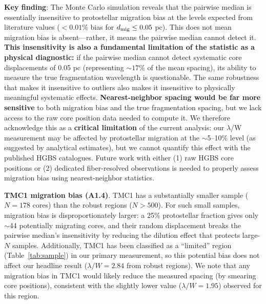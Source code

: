 \documentclass[twoside,twocolumn]{mnras}
\begin{document}
\textbf{Key finding}: The Monte Carlo simulation reveals that the pairwise median is essentially insensitive to protostellar migration bias at the levels expected from literature values ($< 0.01\%$ bias for $d_{\rm mig} \leq 0.05$ pc). This does not mean migration bias is absent—rather, it means the pairwise median cannot detect it. \textbf{This insensitivity is also a fundamental limitation of the statistic as a physical diagnostic:} if the pairwise median cannot detect systematic core displacements of 0.05 pc (representing $\sim 17\%$ of the mean spacing), its ability to measure the true fragmentation wavelength is questionable. The same robustness that makes it insensitive to outliers also makes it insensitive to physically meaningful systematic effects. \textbf{Nearest-neighbor spacing would be far more sensitive} to both migration bias and the true fragmentation spacing, but we lack access to the raw core position data needed to compute it. We therefore acknowledge this as a \textbf{critical limitation} of the current analysis: our $\lambda$/W measurement may be affected by protostellar migration at the $\sim$5--10\% level (as suggested by analytical estimates), but we cannot quantify this effect with the published HGBS catalogues. Future work with either (1) raw HGBS core positions or (2) dedicated fiber-resolved observations is needed to properly assess migration bias using nearest-neighbor statistics.

\textbf{TMC1 migration bias (A1.4)}. TMC1 has a substantially smaller sample ($N = 178$ cores) than the robust regions ($N > 500$). For such small samples, migration bias is disproportionately larger: a 25\% protostellar fraction gives only $\sim$44 potentially migrating cores, and their random displacement breaks the pairwise median's insensitivity by reducing the dilution effect that protects large-$N$ samples. Additionally, TMC1 has been classified as a ``limited'' region (Table~\ref{tab:sample}) in our primary measurement, so this potential bias does not affect our headline result ($\lambda/W = 2.84$ from robust regions). We note that any migration bias in TMC1 would likely reduce the measured spacing (by smearing core positions), consistent with the slightly lower value ($\lambda/W = 1.95$) observed for this region.
\end{document}
